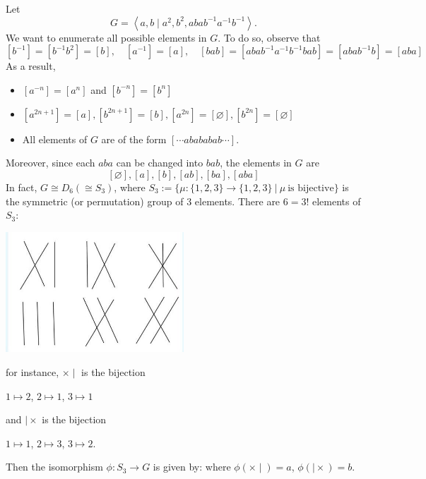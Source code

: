 \begin{example} Let 
\[G = \left\langle  {a,b \mid  {a}^{2},{b}^{2},{aba}{b}^{-1}{a}^{-1}{b}^{-1}}\right\rangle.\] 
We want to enumerate all possible elements in \(G\). To do so, observe that
\[
\left\lbrack  {b}^{-1}\right\rbrack   = \left\lbrack  {{b}^{-1}{b}^{2}}\right\rbrack   = \left\lbrack  b\right\rbrack ,\quad \left\lbrack  {a}^{-1}\right\rbrack   = \left\lbrack  a\right\rbrack,
\quad
\left\lbrack  {bab}\right\rbrack   = \left\lbrack  {{aba}{b}^{-1}{a}^{-1}{b}^{-1}{bab}}\right\rbrack   = \left\lbrack  {{aba}{b}^{-1}b}\right\rbrack   = \left\lbrack  {aba}\right\rbrack
\]
As a result,
\begin{itemize}
\item \(\left\lbrack  {a}^{-n}\right\rbrack   = \left\lbrack  {a}^{n}\right\rbrack\) and \(\left\lbrack  {b}^{-n}\right\rbrack   = \left\lbrack  {b}^{n}\right\rbrack\)
\item \(\left\lbrack  {a}^{{2n} + 1}\right\rbrack   = \left\lbrack  a\right\rbrack ,\left\lbrack  {b}^{{2n} + 1}\right\rbrack   = \left\lbrack  b\right\rbrack ,\left\lbrack  {a}^{2n}\right\rbrack   = \left\lbrack  \varnothing \right\rbrack ,\left\lbrack  {b}^{2n}\right\rbrack   = \left\lbrack  \varnothing \right\rbrack\)
\item All elements of \(G\) are of the form \(\left\lbrack  {\cdots {abababab}\cdots }\right\rbrack\).
\end{itemize}
Moreover, since each $aba$ can be changed into \({bab}\), the elements in \(G\) are
\[
\left\lbrack  \varnothing \right\rbrack ,\left\lbrack  a\right\rbrack ,\left\lbrack  b\right\rbrack ,\left\lbrack  {ab}\right\rbrack ,\left\lbrack  {ba}\right\rbrack ,\left\lbrack  {aba}\right\rbrack
\]
In fact, \(G \cong D_6 (\cong {S}_{3})\), where $S_3 := \{ \mu: \{1,2,3\} \to \{1,2,3\}\ |\ \mu\ \text{is bijective}\}$ is the symmetric (or permutation) group of $3$ elements. There are $6 = 3!$ elements of $S_3$:
\begin{center}
\includegraphics[width=0.5\textwidth]{images/Ch6_symmetric_group.jpg}
\end{center}
for instance, $\times \mid$ is the bijection 
\begin{center}
$1 \mapsto 2$, $2 \mapsto 1$, $3 \mapsto 1$
\end{center}
and $\mid \times$ is the bijection
\begin{center}
$1 \mapsto 1$, $2 \mapsto 3$, $3 \mapsto 2$.
\end{center}
Then the isomorphism \(\phi  : {S}_{3} \rightarrow  G
\) is given by:
where $\phi(\times \mid) = a$, $\phi(\mid  \times) =  b$.
\end{example}

